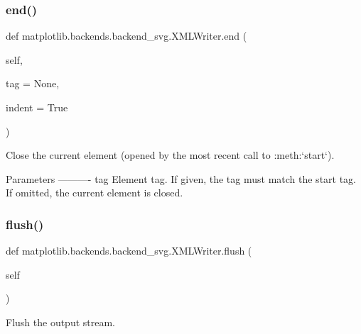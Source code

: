 \subsubsection{\texorpdfstring{end()}{end()}}
{\footnotesize\ttfamily def matplotlib.\+backends.\+backend\+\_\+svg.\+X\+M\+L\+Writer.\+end (\begin{DoxyParamCaption}\item[{}]{self,  }\item[{}]{tag = {\ttfamily None},  }\item[{}]{indent = {\ttfamily True} }\end{DoxyParamCaption})}

\begin{DoxyVerb}Close the current element (opened by the most recent call to
:meth:`start`).

Parameters
----------
tag
    Element tag.  If given, the tag must match the start tag.  If
    omitted, the current element is closed.
\end{DoxyVerb}
 \mbox{\label{classmatplotlib_1_1backends_1_1backend__svg_1_1XMLWriter_a977cf00f61ccd9c974a20a925535d83a}} 
\subsubsection{\texorpdfstring{flush()}{flush()}}
{\footnotesize\ttfamily def matplotlib.\+backends.\+backend\+\_\+svg.\+X\+M\+L\+Writer.\+flush (\begin{DoxyParamCaption}\item[{}]{self }\end{DoxyParamCaption})}

\begin{DoxyVerb}Flush the output stream.\end{DoxyVerb}
 \mbox{\label{classmatplotlib_1_1backends_1_1backend__svg_1_1XMLWriter_a98d6486ea40d99414ee9a46491890a5b}} 
